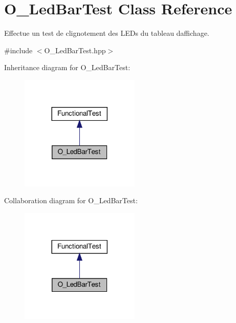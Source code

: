 \hypertarget{classO__LedBarTest}{}\section{O\+\_\+\+Led\+Bar\+Test Class Reference}
\label{classO__LedBarTest}


Effectue un test de clignotement des L\+E\+Ds du tableau d\textquotesingle{}affichage.  




{\ttfamily \#include $<$O\+\_\+\+Led\+Bar\+Test.\+hpp$>$}



Inheritance diagram for O\+\_\+\+Led\+Bar\+Test\+:
\nopagebreak
\begin{figure}[H]
\begin{center}
\leavevmode
\includegraphics[width=161pt]{classO__LedBarTest__inherit__graph}
\end{center}
\end{figure}


Collaboration diagram for O\+\_\+\+Led\+Bar\+Test\+:
\nopagebreak
\begin{figure}[H]
\begin{center}
\leavevmode
\includegraphics[width=161pt]{classO__LedBarTest__coll__graph}
\end{center}
\end{figure}
